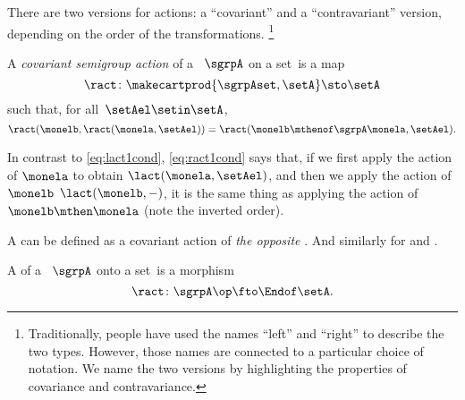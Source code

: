 There are two versions for actions: a ``covariant'' and a ``contravariant'' version, depending on the order of the transformations.
\footnote{
    Traditionally, people have used the names ``left'' and ``right'' to describe the two types.
    However, those names are connected to a particular choice of notation.
    We name the two versions by highlighting the properties of covariance and contravariance.
}

\begin{ctdefinition}
    \label{def:semigroup-contra-action-prelim}
    A \emph{covariant semigroup action} of a ~$\sgrpA$ on a set~\setA is a map
    \begin{equation}
        \label{eq:ract}
        \ract \colon \makecartprod{\sgrpAset, \setA} \sto \setA
    \end{equation}
    such that, for all~$\setAel \setin \setA$,
    \begin{equation}
        \label{eq:ract1cond}
        \ract(\monelb, \ract(\monela, \setAel)) = \ract(\monelb \mthenof\sgrpA  \monela, \setAel).
    \end{equation}
\end{ctdefinition}

In contrast to \cref{eq:lact1cond},  \cref{eq:ract1cond} says that, if we first apply the action of $\monela$ to obtain $\lact(\monela, \setAel)$,
and then we apply the action of $\monelb$ $\lact(\monelb, -)$, it is the same thing as applying the action of $\monelb\mthen\monela$ (note the inverted order).

A  can be defined as a covariant action of \emph{the opposite} .
And similarly for  and .


\begin{ctdefinition}
    \label{def:semigroup-cont-action}
    A  of a ~$\sgrpA$ onto a set~\setA is a  morphism
    \begin{equation}
        \ract \colon \sgrpA\op \fto \Endof\setA.
    \end{equation}
\end{ctdefinition}

